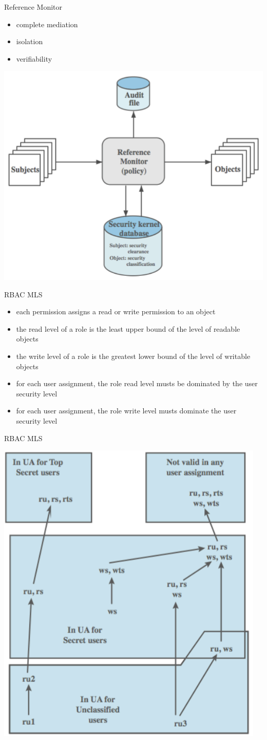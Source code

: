 \documentclass{beamer}
\begin{document}
\begin{frame}{Reference Monitor}
  \begin{itemize}
  \item complete mediation
  \item isolation
  \item verifiability
  \end{itemize}
  \begin{center}
    \includegraphics[width=0.5\linewidth]{reference_monitor}
  \end{center}
\end{frame}

\begin{frame}{RBAC MLS}
  \begin{itemize}
    \item each permission assigns a read or write permission to an
      object
    \item the read level of a role is the least upper bound of the
      level of readable objects
    \item the write level of a role is the greatest lower bound of the
      level of writable objects
    \item for each user assignment, the role read level musts be
      dominated by the user security level  
    \item for each user assignment, the role write level musts dominate
      the user security level  
  \end{itemize}
\end{frame}

\begin{frame}{RBAC MLS}
  \begin{center}
    \includegraphics[width=0.6\linewidth]{roles}
  \end{center}
\end{frame}
\end{document}
